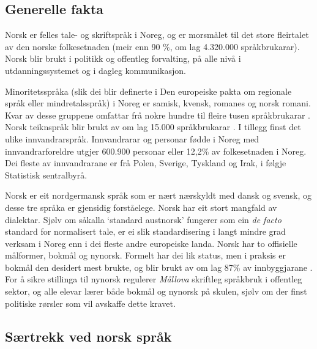 \clearpage


\begin{multicols}{2}

\subsection{Generelle fakta}

Norsk er felles tale- og skriftspråk i Noreg, og er morsmålet til det store fleirtalet av den norske folkesetnaden (meir enn 90 \%, om lag 4.320.000 språkbrukarar). 
Norsk blir brukt i politikk og offentleg forvalting, på alle nivå i utdanningssystemet og i dagleg kommunikasjon.


Minoritetsspråka (slik dei blir definerte i Den europeiske pakta om regionale språk eller mindretalsspråk) i Noreg er samisk, kvensk, romanes og norsk romani. Kvar av desse gruppene omfattar frå nokre hundre til fleire tusen språkbrukarar \cite{stm35:2008}. 
Norsk teiknspråk blir brukt av om lag 15.000 språkbrukarar \cite{Erl:2007}. 
I tillegg finst det ulike innvandrarspråk. 
Innvandrarar og personar fødde i Noreg med innvandrarforeldre utgjer 600.900 personar eller 12,2\% av folkesetnaden i Noreg. Dei fleste av innvandrarane er frå Polen, Sverige, Tyskland og Irak, i følgje Statistisk sentralbyrå.

Norsk er eit nordgermansk språk som er nært nærskyldt med dansk og svensk, og desse tre språka er gjensidig forståelege. 
Norsk har eit stort mangfald av dialektar. 
Sjølv om såkalla `standard austnorsk' fungerer som ein \textit{de facto} standard for normalisert tale, er ei slik standardisering i langt mindre grad verksam i Noreg enn i dei fleste andre europeiske landa.
Norsk har to offisielle målformer, bokmål og nynorsk. Formelt har dei lik status, men i praksis er bokmål den desidert mest brukte, og blir brukt av om lag 87\% av innbyggjarane \cite{stm35:2008}. 
For å sikre stillinga til nynorsk regulerer \textit{Mållova} skriftleg språkbruk i offentleg sektor, og alle elevar lærer både bokmål og nynorsk på skulen, sjølv om der finst politiske rørsler som vil avskaffe dette kravet.

\subsection{Særtrekk ved norsk språk}


\end{multicols}
